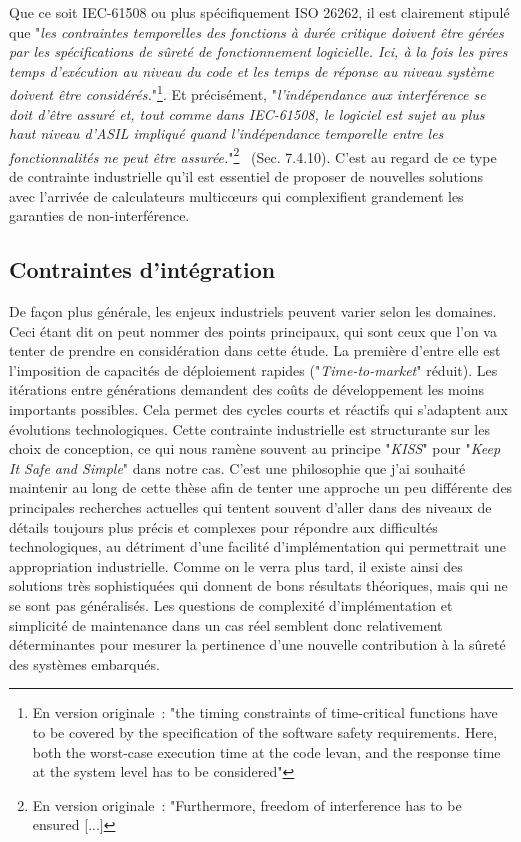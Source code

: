 \documentclass[french, a4paper, 11pt, twoside, pdftex]{StyleThese}
\begin{document}
		Que ce soit IEC-61508 ou plus spécifiquement ISO 26262, il est clairement stipulé que 
		"\textit{les contraintes temporelles des fonctions à durée critique doivent être gérées par les spécifications de sûreté de fonctionnement logicielle. Ici, à la fois les pires temps d'exécution au niveau du code et les temps de réponse au niveau système doivent être considérés.}"\footnote{En version originale~: "the timing constraints of time-critical functions have to be covered by the specification of the software safety requirements. Here, both the worst-case execution time at the code levan, and the response time at the system level has to be considered"}. Et précisément, "\textit{l'indépendance aux interférence se doit d'être assuré et, tout comme dans IEC-61508, le logiciel est sujet au plus haut niveau d'ASIL impliqué quand l'indépendance temporelle entre les fonctionnalités ne peut être assurée.}"\footnote{En version originale~: "Furthermore, freedom of interference has to be ensured [...]}~\cite{iso_26262-7_road_2018} (Sec. 7.4.10). C'est au regard de ce type de contrainte industrielle qu'il est essentiel de proposer de nouvelles solutions avec l'arrivée de calculateurs multicœurs qui complexifient grandement les garanties de non-interférence.
	
	\subsection{Contraintes d'intégration}
			
	De façon plus générale, les enjeux industriels peuvent varier selon les domaines. Ceci étant dit on peut nommer des points principaux, qui sont ceux que l'on va tenter de prendre en considération dans cette étude. La première d'entre elle est l'imposition de capacités de déploiement rapides ("\textit{Time-to-market}" réduit). Les itérations entre générations demandent des coûts de développement les moins importants possibles. Cela permet des cycles courts et réactifs qui s'adaptent aux évolutions technologiques. Cette contrainte industrielle est structurante sur les choix de conception, ce qui nous ramène souvent au principe "\emph{KISS}" pour "\emph{Keep It Safe and Simple}" dans notre cas. C'est une philosophie que j'ai souhaité maintenir au long de cette thèse afin de tenter une approche un peu différente des principales recherches actuelles qui tentent souvent d'aller dans des niveaux de détails toujours plus précis et complexes pour répondre aux difficultés technologiques, au détriment d'une facilité d'implémentation qui permettrait une appropriation industrielle. Comme on le verra plus tard, il existe ainsi des solutions très sophistiquées qui donnent de bons résultats théoriques, mais qui ne se sont pas généralisés. Les questions de complexité d'implémentation et simplicité de maintenance dans un cas réel semblent donc relativement déterminantes pour mesurer la pertinence d'une nouvelle contribution à la sûreté des systèmes embarqués. 
	
\end{document}
